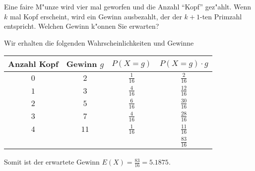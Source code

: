 Eine faire M"unze wird vier mal geworfen und die Anzahl ``Kopf'' gez"ahlt.
Wenn $k$ mal Kopf erscheint, wird ein Gewinn ausbezahlt, der der $k+1$-ten
Primzahl entspricht. Welchen Gewinn k"onnen Sie erwarten?

\begin{loesung}
Wir erhalten die folgenden Wahrscheinlichkeiten und Gewinne
\begin{center}
\begin{tabular}{|c|c|c|c|}
\hline
Anzahl Kopf&Gewinn $g$&$P(X=g)$&$P(X=g)\cdot g$\\
\hline
$0$&$2$&$\frac1{16}$&$\frac2{16}$\\
$1$&$3$&$\frac4{16}$&$\frac{12}{16}$\\
$2$&$5$&$\frac6{16}$&$\frac{30}{16}$\\
$3$&$7$&$\frac4{16}$&$\frac{28}{16}$\\
$4$&$11$&$\frac1{16}$&$\frac{11}{16}$\\
\hline
&&&$\frac{83}{16}$\\
\hline
\end{tabular}
\end{center}
Somit ist der erwartete Gewinn $E(X)=\frac{83}{16}=5.1875$.
\end{loesung}


